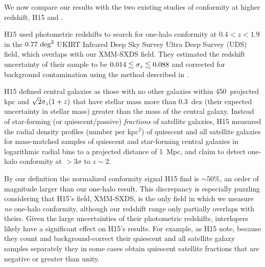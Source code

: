 We now compare our results with the two existing studies of conformity at higher redshift, H15 and \citet{Kawinwanichakij16}.

H15 used photometric redshifts to search for one-halo conformity at ${0.4<z<1.9}$ in the ${0.77~\degsq}$ 
UKIRT Infrared Deep Sky Survey \citep[UKIDSS;][]{Lawrence07} Ultra Deep Survey (UDS) field, which overlaps with our XMM-SXDS field.
They estimated the redshift uncertainty of their sample to be ${0.014 \lesssim \sigmaz \lesssim 0.088}$ and corrected for background contamination using the method described in \citet{Chen06}.

H15 defined central galaxies as those with no other galaxies within 450~projected kpc and ${\sqrt{2}\sigmaz(1 + z)}$
that have stellar mass more than 0.3~dex (their expected uncertainty in stellar mass) greater than the mass of the central galaxy.
Instead of star-forming (or quiescent/passive) \emph{fractions} of satellite galaxies,
H15 measured the radial density profiles (number per kpc$^2$) of quiescent and all satellite galaxies for mass-matched samples of quiescent and star-forming central galaxies in logarithmic radial bins to a projected distance of 1~Mpc, and claim to detect one-halo conformity at $>3\sigma$ to $z\sim2$.

By our definition the normalized conformity signal H15 find is $\sim50$\%, an order of magnitude larger than our one-halo result.
This discrepancy is especially puzzling considering that H15's field, XMM-SXDS, is the only field in which we measure \emph{no} one-halo conformity, although our redshift range only partially overlaps with theirs.
Given the large uncertainties of their photometric redshifts, interlopers likely have a significant effect on H15's results.
For example, as H15 note, because they count and background-correct their quiescent and all satellite galaxy samples separately they in some cases obtain quiescent satellite fractions that are negative or greater than unity.


